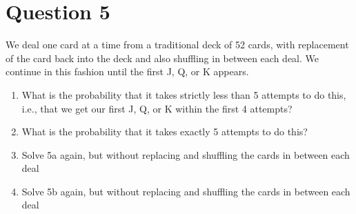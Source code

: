 \documentclass[a4paper, 11pt]{article}
\begin{document}
\section*{Question 5}
We  deal  one  card  at  a  time  from  a traditional  deck  of  52  cards,  with  replacement  of
the card back into the deck and also shuffling in between each deal.  We continue in this
fashion until the first J, Q, or K appears.
\begin{enumerate}[label=(\alph*)]
    \item What is the probability that it takes strictly less than 5 attempts to do this, i.e., that
          we get our first J, Q, or K within the first 4 attempts?
    \item What is the probability that it takes exactly 5 attempts to do this?
    \item Solve 5a again, but without replacing and shuffling the cards in between each deal
    \item Solve 5b again, but without replacing and shuffling the cards in between each deal
\end{enumerate}
\end{document}
